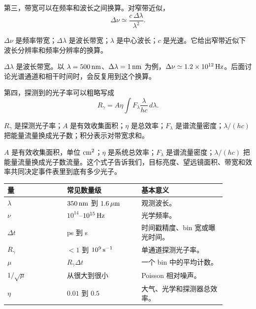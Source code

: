 第三，带宽可以在频率和波长之间换算。对窄带近似，
\begin{equation}
  \Delta\nu\simeq \frac{c\,\Delta\lambda}{\lambda^2}.
  \label{eq:bandwidth-conversion}
\end{equation}
\begin{formulaexplain}
\(\Delta\nu\) 是频率带宽；\(\Delta\lambda\) 是波长带宽；\(\lambda\) 是中心波长；\(c\) 是光速。它给出窄带近似下波长分辨率和频率分辨率的换算。
\end{formulaexplain}
\(\Delta\lambda\) 是波长带宽。以 \(\lambda=500\,{\rm nm}\)、\(\Delta\lambda=1\,{\rm nm}\) 为例，\(\Delta\nu\simeq1.2\times10^{12}\,{\rm Hz}\)。后面讨论光谱通道和相干时间时，会反复用到这个换算。

第四，探测到的光子率可以粗略写成
\begin{equation}
  R_\gamma=A\eta\int F_\lambda\frac{\lambda}{hc}\,d\lambda .
  \label{eq:photon-rate}
\end{equation}
\begin{formulaexplain}
\(R_\gamma\) 是探测光子率；\(A\) 是有效收集面积；\(\eta\) 是总效率；\(F_\lambda\) 是谱流量密度；\(\lambda/(hc)\) 把能量流量换成光子数；积分表示对带宽求和。
\end{formulaexplain}
\(A\) 是有效收集面积，单位 \({\rm cm^2}\)；\(\eta\) 是系统总效率；\(F_\lambda\) 是谱流量密度；\(\lambda/(hc)\) 把能量流量换成光子数流量。这个式子告诉我们，目标亮度、望远镜面积、带宽和效率共同决定事件表里到底有多少光子。

\begin{longtable}{p{0.24\linewidth}p{0.30\linewidth}p{0.34\linewidth}}
\toprule
量 & 常见数量级 & 基本意义 \\
\midrule
\(\lambda\) & \(350\,{\rm nm}\) 到 \(1.6\,\mu{\rm m}\) & 观测波长。 \\
\(\nu\) & \(10^{14}\)--\(10^{15}\,{\rm Hz}\) & 光学频率。 \\
\(\Delta t\) & ps 到 s & 时间戳精度、bin 宽或曝光时间。 \\
\(R_\gamma\) & \(<1\) 到 \(10^9\,{\rm s^{-1}}\) & 单通道探测光子率。 \\
\(\mu\) & \(R_\gamma\Delta t\) & 一个 bin 中的平均计数。 \\
\(1/\sqrt{\mu}\) & 从很大到很小 & Poisson 相对噪声。 \\
\(\eta\) & \(0.01\) 到 \(0.5\) & 大气、光学和探测器总效率。 \\
\bottomrule
\end{longtable}

